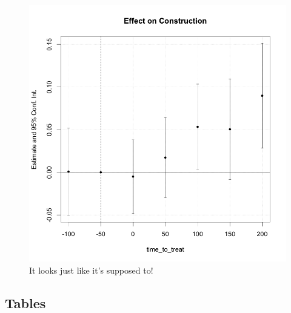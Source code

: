\documentclass[11pt, a4paper]{article}
\begin{document}
\begin{figure}[ht]
    \centering
    \includegraphics[scale = 0.4]{paper/output/regressions/SW22_replication_50y.png}
    \caption{It looks just like it's supposed to!}
    \label{fig:SW_replication}
\end{figure}

\clearpage
\subsection*{Tables}

% 


\end{document}
